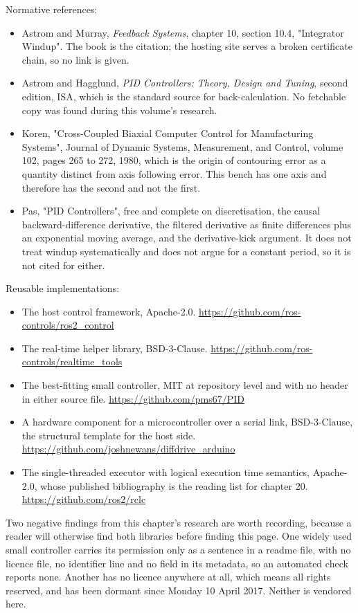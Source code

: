 Normative references:
\begin{itemize}
\item Astrom and Murray, \textit{Feedback Systems}, chapter 10, section 10.4,
"Integrator Windup". The book is the citation; the hosting site serves a broken
certificate chain, so no link is given.
\item Astrom and Hagglund, \textit{PID Controllers: Theory, Design and Tuning},
second edition, ISA, which is the standard source for back-calculation. No
fetchable copy was found during this volume's research.
\item Koren, "Cross-Coupled Biaxial Computer Control for Manufacturing Systems",
Journal of Dynamic Systems, Measurement, and Control, volume 102, pages 265 to
272, 1980, which is the origin of contouring error as a quantity distinct from
axis following error. This bench has one axis and therefore has the second and
not the first.
\item Pas, "PID Controllers", free and complete on discretisation, the causal
backward-difference derivative, the filtered derivative as finite differences
plus an exponential moving average, and the derivative-kick argument. It does not
treat windup systematically and does not argue for a constant period, so it is
not cited for either.
\end{itemize}

Reusable implementations:
\begin{itemize}
\item The host control framework, Apache-2.0.\newline
\url{https://github.com/ros-controls/ros2_control}
\item The real-time helper library, BSD-3-Clause.\newline
\url{https://github.com/ros-controls/realtime_tools}
\item The best-fitting small controller, MIT at repository level and with no
header in either source file.\newline
\url{https://github.com/pms67/PID}
\item A hardware component for a microcontroller over a serial link,
BSD-3-Clause, the structural template for the host side.\newline
\url{https://github.com/joshnewans/diffdrive_arduino}
\item The single-threaded executor with logical execution time semantics,
Apache-2.0, whose published bibliography is the reading list for chapter 20.\newline
\url{https://github.com/ros2/rclc}
\end{itemize}

Two negative findings from this chapter's research are worth recording, because
a reader will otherwise find both libraries before finding this page. One widely
used small controller carries its permission only as a sentence in a readme file,
with no licence file, no identifier line and no field in its metadata, so an
automated check reports none. Another has no licence anywhere at all, which means
all rights reserved, and has been dormant since Monday 10 April 2017. Neither is
vendored here.
